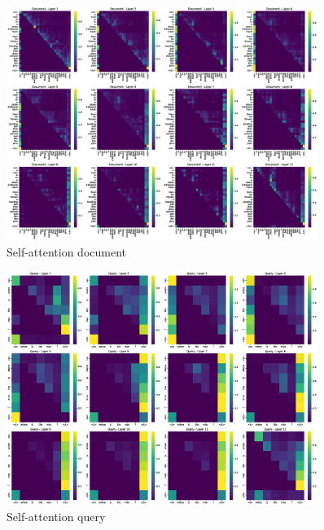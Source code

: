 \documentclass[runningheads]{llncs}
\begin{document}
\clearpage

\begin{figure}[!htb]
  \centering
  \includegraphics[width=0.90\textwidth, clip=true]{../figures/attention_layers_document.eps}
  \caption{Self-attention document}\label{self_att_document}\label{img:self_attention_document}
\end{figure}


\begin{figure}[!htb]
  \centering
  \includegraphics[width=0.9\textwidth, clip=true]{../figures/attention_layers_query.eps}
  \caption{Self-attention query}\label{self_att_query}\label{img:self_attention_query}
\end{figure}

\clearpage

\vspace{2\baselineskip plus 0.5\baselineskip minus 0.5\baselineskip} %
\end{document}
